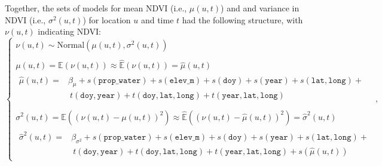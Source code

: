 \documentclass{article}
\begin{document}
Together, the sets of models for mean NDVI (i.e., $\mu(u, t)$) and and variance in NDVI (i.e., $\sigma^2(u, t)$) for location $u$ and time $t$ had the following structure, with $\nu(u, t)$ indicating NDVI:
\begin{equation} \label{eq:model}
\begin{cases}
\nu (u, t) \sim \text{Normal}(\mu(u, t), \sigma^2(u, t)) \\

\\

\mu(u, t) = \mathbb E(\nu(u, t)) \approx \hat {\mathbb E}(\nu(u, t)) = \hat \mu(u, t) \\

\begin{split}
\hat \mu(u, t) = &\beta_{\mu} + s(\texttt{prop\_water}) + s(\texttt{elev\_m}) + s(\texttt{doy}) + s(\texttt{year}) + s(\texttt{lat}, \texttt{long}) + \\
&~t(\texttt{doy}, \texttt{year}) + t(\texttt{doy}, \texttt{lat}, \texttt{long}) + t(\texttt{year}, \texttt{lat}, \texttt{long})
\end{split} \\

\\

\sigma^2(u, t) = \mathbb E\left((\nu(u, t) - \mu(u, t))^2\right) \approx \hat {\mathbb E}\left((\nu(u, t) - \hat \mu(u, t))^2\right) = \hat \sigma^2(u, t) \\

\begin{split}
\hat \sigma^2(u, t) = &\beta_{\sigma^2} + s(\texttt{prop\_water}) + s(\texttt{elev\_m}) + s(\texttt{doy}) + s(\texttt{year}) + s(\texttt{lat}, \texttt{long}) + \\
&~t(\texttt{doy}, \texttt{year}) + t(\texttt{doy}, \texttt{lat}, \texttt{long}) + t(\texttt{year}, \texttt{lat}, \texttt{long}) + s(\hat \mu(u, t))
\end{split}
\end{cases},
\end{equation}
\end{document}
